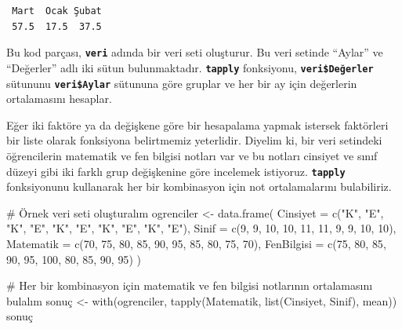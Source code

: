 \documentclass[
  letterpaper,
  DIV=11,
  numbers=noendperiod]{scrreprt}
\newenvironment{Shaded}{\begin{snugshade}}{\end{snugshade}}
\newcommand{\AttributeTok}[1]{\textcolor[rgb]{0.40,0.45,0.13}{#1}}
\newcommand{\CommentTok}[1]{\textcolor[rgb]{0.37,0.37,0.37}{#1}}
\newcommand{\DecValTok}[1]{\textcolor[rgb]{0.68,0.00,0.00}{#1}}
\newcommand{\FunctionTok}[1]{\textcolor[rgb]{0.28,0.35,0.67}{#1}}
\newcommand{\NormalTok}[1]{\textcolor[rgb]{0.00,0.23,0.31}{#1}}
\newcommand{\OtherTok}[1]{\textcolor[rgb]{0.00,0.23,0.31}{#1}}
\newcommand{\StringTok}[1]{\textcolor[rgb]{0.13,0.47,0.30}{#1}}
\begin{document}
\begin{verbatim}
 Mart  Ocak Şubat 
 57.5  17.5  37.5 
\end{verbatim}

Bu kod parçası, \textbf{\texttt{veri}} adında bir veri seti oluşturur.
Bu veri setinde ``Aylar'' ve ``Değerler'' adlı iki sütun bulunmaktadır.
\textbf{\texttt{tapply}} fonksiyonu, \textbf{\texttt{veri\$Değerler}}
sütununu \textbf{\texttt{veri\$Aylar}} sütununa göre gruplar ve her bir
ay için değerlerin ortalamasını hesaplar.

Eğer iki faktöre ya da değişkene göre bir hesapalama yapmak istersek
faktörleri bir liste olarak fonksiyona belirtmemiz yeterlidir. Diyelim
ki, bir veri setindeki öğrencilerin matematik ve fen bilgisi notları var
ve bu notları cinsiyet ve sınıf düzeyi gibi iki farklı grup değişkenine
göre incelemek istiyoruz. \textbf{\texttt{tapply}} fonksiyonunu
kullanarak her bir kombinasyon için not ortalamalarını bulabiliriz.

\begin{Shaded}
\begin{Highlighting}[]
\CommentTok{\# Örnek veri seti oluşturalım}
\NormalTok{ogrenciler }\OtherTok{\textless{}{-}} \FunctionTok{data.frame}\NormalTok{(}
  \AttributeTok{Cinsiyet =} \FunctionTok{c}\NormalTok{(}\StringTok{"K"}\NormalTok{, }\StringTok{"E"}\NormalTok{, }\StringTok{"K"}\NormalTok{, }\StringTok{"E"}\NormalTok{, }\StringTok{"K"}\NormalTok{, }\StringTok{"E"}\NormalTok{, }\StringTok{"K"}\NormalTok{, }\StringTok{"E"}\NormalTok{, }\StringTok{"K"}\NormalTok{, }\StringTok{"E"}\NormalTok{),}
  \AttributeTok{Sinif =} \FunctionTok{c}\NormalTok{(}\DecValTok{9}\NormalTok{, }\DecValTok{9}\NormalTok{, }\DecValTok{10}\NormalTok{, }\DecValTok{10}\NormalTok{, }\DecValTok{11}\NormalTok{, }\DecValTok{11}\NormalTok{, }\DecValTok{9}\NormalTok{, }\DecValTok{9}\NormalTok{, }\DecValTok{10}\NormalTok{, }\DecValTok{10}\NormalTok{),}
  \AttributeTok{Matematik =} \FunctionTok{c}\NormalTok{(}\DecValTok{70}\NormalTok{, }\DecValTok{75}\NormalTok{, }\DecValTok{80}\NormalTok{, }\DecValTok{85}\NormalTok{, }\DecValTok{90}\NormalTok{, }\DecValTok{95}\NormalTok{, }\DecValTok{85}\NormalTok{, }\DecValTok{80}\NormalTok{, }\DecValTok{75}\NormalTok{, }\DecValTok{70}\NormalTok{),}
  \AttributeTok{FenBilgisi =} \FunctionTok{c}\NormalTok{(}\DecValTok{75}\NormalTok{, }\DecValTok{80}\NormalTok{, }\DecValTok{85}\NormalTok{, }\DecValTok{90}\NormalTok{, }\DecValTok{95}\NormalTok{, }\DecValTok{100}\NormalTok{, }\DecValTok{80}\NormalTok{, }\DecValTok{85}\NormalTok{, }\DecValTok{90}\NormalTok{, }\DecValTok{95}\NormalTok{)}
\NormalTok{)}

\CommentTok{\# Her bir kombinasyon için matematik ve fen bilgisi notlarının ortalamasını bulalım}
\NormalTok{sonuç }\OtherTok{\textless{}{-}} \FunctionTok{with}\NormalTok{(ogrenciler, }\FunctionTok{tapply}\NormalTok{(Matematik, }\FunctionTok{list}\NormalTok{(Cinsiyet, Sinif), mean))}
\NormalTok{sonuç}
\end{Highlighting}
\end{Shaded}
\end{document}
